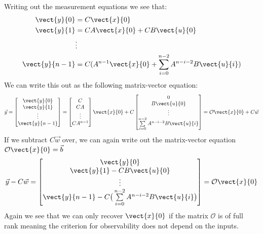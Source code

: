 \begin{enumerate}
{    Writing out the measurement equations we see that:
    \begin{align*} 
      \vect{y}{0} &= C \vect{x}{0} \\
      \vect{y}{1} &= CA \vect{x}{0} + CB \vect{u}{0} \\ 
      &\vdots \\ 
      \vect{y}{n-1} &= C (A^{n - 1} \vect{x}{0} + \sum\limits_{i = 0}^{n - 2} A^{n - i - 2} B \vect{u}{i})
    \end{align*}
    We can write this out as the following matrix-vector equation:
    \[ \vec{y} = \begin{bmatrix} \vect{y}{0} \\ \vect{y}{1} \\ \vdots \\ \vect{y}{n-1} \end{bmatrix} = 
    \begin{bmatrix} C \\ CA \\ \vdots \\ CA^{n-1} \end{bmatrix} \vect{x}{0} + C \begin{bmatrix} 0 \\ B \vect{u}{0} \\ \vdots \\ \sum\limits_{i = 0}^{n - 2} A^{n - i - 2} B \vect{u}{i} \end{bmatrix} = \mathcal{O} \vect{x}{0} + C\vec{w} 
    \]
    If we subtract $C\vec{w}$ over, we can again write out the matrix-vector equation $\mathcal{O} \vect{x}{0} = \vec{b}$
    \[ \vec{y} - C\vec{w} = \begin{bmatrix} \vect{y}{0} \\ \vect{y}{1} - CB \vect{u}{0} \\ \vdots \\ \vect{y}{n-1} - C \big( \sum\limits_{i = 0}^{n - 2} A^{n - i - 2} B \vect{u}{i} \big) \end{bmatrix} = \mathcal{O} \vect{x}{0} \]
    Again we see that we can only recover $\vect{x}{0}$ if the matrix $\mathcal{O}$ is of full rank meaning the criterion for observability does not depend on the inputs.
  }

\end{enumerate}


